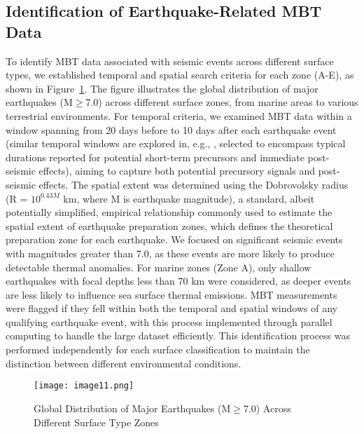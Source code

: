 \documentclass[fleqn,10pt]{wlscirep_mdpi_style}
\begin{document}
\subsection{Identification of Earthquake-Related MBT Data}
To identify MBT data associated with seismic events across different surface types, we established temporal and spatial search criteria for each zone (A-E), as shown in Figure~\ref{fig:fig11}. The figure illustrates the global distribution of major earthquakes (M$\ge$7.0) across different surface zones, from marine areas to various terrestrial environments. For temporal criteria, we examined MBT data within a window spanning from 20 days before to 10 days after each earthquake event (similar temporal windows are explored in, e.g., \cite{akhoondzadehMultiPrecursorsAnalysis2018,singhPrecursorySignalsUsing2010,qiSpatiotemporallyWeightedTwostep2020}, selected to encompass typical durations reported for potential short-term precursors and immediate post-seismic effects), aiming to capture both potential precursory signals and post-seismic effects. The spatial extent was determined using the Dobrovolsky radius \cite{dobrovolskyEstimationSizeEarthquake1979} (R = $10^{0.43M}$ km, where M is earthquake magnitude), a standard, albeit potentially simplified, empirical relationship commonly used to estimate the spatial extent of earthquake preparation zones, which defines the theoretical preparation zone for each earthquake. We focused on significant seismic events with magnitudes greater than 7.0, as these events are more likely to produce detectable thermal anomalies. For marine zones (Zone A), only shallow earthquakes with focal depths less than 70 km were considered, as deeper events are less likely to influence sea surface thermal emissions. MBT measurements were flagged if they fell within both the temporal and spatial windows of any qualifying earthquake event, with this process implemented through parallel computing to handle the large dataset efficiently. This identification process was performed independently for each surface classification to maintain the distinction between different environmental conditions.

\begin{figure}[!htbp]
\centering
\texttt{[image: image11.png]}
\caption{Global Distribution of Major Earthquakes (M$\ge$7.0) Across Different Surface Type Zones}
\label{fig:fig11}
\end{figure}
\end{document}
